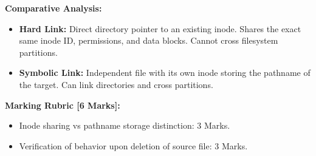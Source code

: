 \begin{examsol}
\textbf{Comparative Analysis:}
\begin{itemize}[leftmargin=1.5em]
    \item \textbf{Hard Link:} Direct directory pointer to an existing inode. Shares the exact same inode ID, permissions, and data blocks. Cannot cross filesystem partitions.
    \item \textbf{Symbolic Link:} Independent file with its own inode storing the pathname of the target. Can link directories and cross partitions.
\end{itemize}


\begin{markingrubric}
\textbf{Marking Rubric [6 Marks]:}
\begin{itemize}[leftmargin=1.5em]
    \item Inode sharing vs pathname storage distinction: 3 Marks.
    \item Verification of behavior upon deletion of source file: 3 Marks.
\end{itemize}
\end{markingrubric}
\end{examsol}
